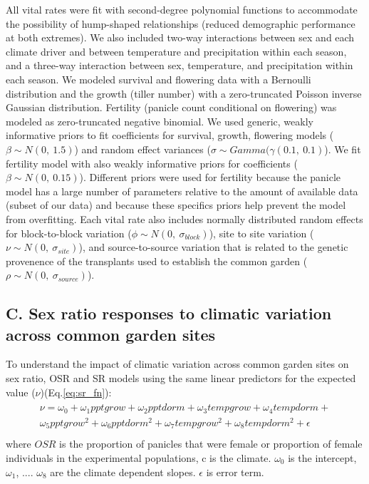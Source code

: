 \documentclass[9pt,twoside,lineno]{pnas-new}
\begin{document}
All  vital rates  were  fit with second-degree polynomial functions to accommodate the possibility of hump-shaped relationships (reduced demographic performance at both extremes).
We also included two-way interactions between sex and each climate driver and between temperature and precipitation within each season, and a three-way interaction between sex, temperature, and precipitation within each season. 
We modeled survival and flowering data with a Bernoulli distribution and the growth (tiller number) with a zero-truncated Poisson inverse Gaussian distribution. 
Fertility (panicle count conditional on flowering) was modeled as zero-truncated negative binomial. 
We used generic, weakly informative priors to fit coefficients for survival, growth, flowering models ($\beta \sim N(0,\ 1.5)$) and random effect variances ($\sigma \sim Gamma(\gamma (0.1,\ 0.1)$).
We fit fertility model with  also weakly informative priors for coefficients ($\beta \sim N(0,\ 0.15)$).
Different priors  were used for fertility because the panicle model has a large number of parameters relative to the amount of available data (subset of our data) and because these specifics priors help  prevent the model from overfitting. 
Each vital rate also includes normally distributed random effects for block-to-block variation ($\phi \sim N(0,\ \sigma_{block})$), site to site variation ($\nu \sim N(0,\ \sigma_{site})$), and source-to-source variation that is related to the genetic provenence of the transplants used to establish the common garden ($\rho \sim N(0,\ \sigma_{source})$).



\subsection*{C. Sex ratio responses to climatic variation across common garden sites} \label {sssec:sexratio_bayesian}
To understand the impact of climatic variation across common garden sites on sex ratio, OSR and SR  models using  the same linear predictors for the expected value ($\nu$)(Eq.\ref{eq:sr_fn}):
\begin{align}\label{eq:sr_fn}
\begin{split}
	\nu =   \omega_{0}+ \omega_{1}pptgrow + \omega_{2}pptdorm + \omega_{3}tempgrow + \omega_{4}tempdorm + \\
	  \omega_{5}pptgrow^2 + \omega_{6}pptdorm^2 + \omega_{7}tempgrow^2 + \omega_{8}tempdorm^2 + \epsilon\\
\end{split}
\end{align}
\noindent where $OSR$ is the proportion of panicles that were female or proportion of female individuals in the experimental populations, c is the climate. 
$\omega_{0}$ is the intercept, $\omega_{1}$, .... $\omega_{8}$ are the climate dependent slopes. $\epsilon$ is error term.
\end{document}
